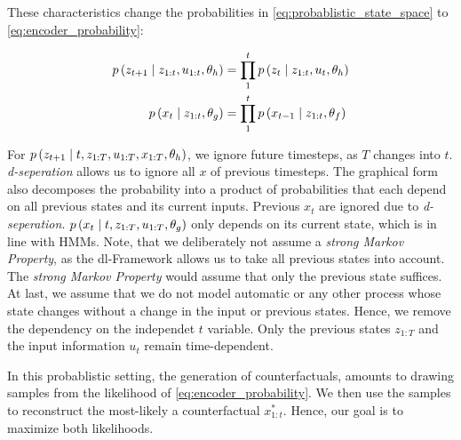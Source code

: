 \documentclass[./../../paper.tex]{subfiles}
\begin{document}

These characteristics change the probabilities in \autoref{eq:probablistic_state_space} to \autoref{eq:encoder_probability}:

\begin{align}
    \label{eq:encoder_probability}
    p\left(z_{t+1} \mid z_{1:t}, u_{1:t}, \theta_h\right)                   & =  \prod_{1}^{t} p\left(z_t \mid z_{1:t}, u_{t}, \theta_h\right) \\
    p\left(x_t \mid z_{1:t}, \theta_g\right)                   & = \prod_{1}^{t} p\left(x_{t-1} \mid z_{1:t},\theta_f\right)
\end{align}

For $p\left(z_{t+1} \mid t, z_{1:T}, u_{1:T}, x_{1:T}, \theta_h\right)$, we ignore future timesteps, as $T$ changes into $t$. \emph{d-seperation} allows us to ignore all $x$ of previous timesteps. The graphical form also decomposes the probability into a product of probabilities that each depend on all previous states and its current inputs. Previous $x_t$ are ignored due to \emph{d-seperation}. $p\left(x_t \mid t, z_{1:T}, u_{1:T}, \theta_g\right)$ only depends on its current state, which is in line with \glspl{HMM}.
Note, that we deliberately not assume a \emph{strong Markov Property}, as the \gls{dl}-Framework allows us to take all previous states into account. The \emph{strong Markov Property} would assume that only the previous state suffices. At last, we assume that we do not model automatic or any other process whose state changes without a change in the input or previous states. Hence, we remove the dependency on the independet $t$ variable. Only the previous states $z_{1:T}$ and the input information $u_t$ remain time-dependent. 

In this probablistic setting, the generation of counterfactuals, amounts to drawing samples from the likelihood of \autoref{eq:encoder_probability}. We then use the samples to reconstruct the most-likely a counterfactual $x_{1:t}^*$. Hence, our goal is to maximize both likelihoods. 

\end{document}
